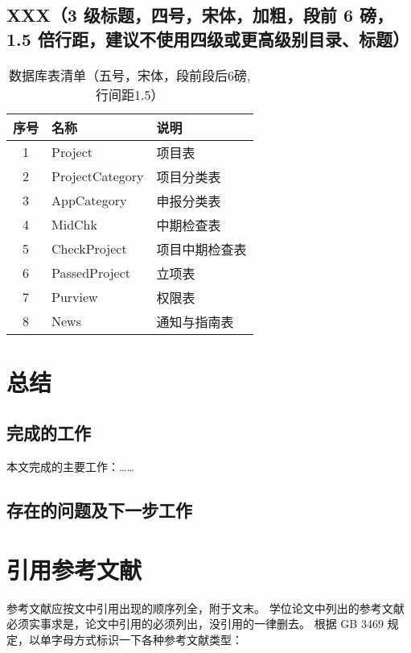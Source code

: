\documentclass[12pt]{zjutbook}
\begin{document}
\section{XXX（3 级标题，四号，宋体，加粗，段前 6 磅，1.5 倍行距，建议不使用四级或更高级别目录、标题）}
\begin{table}
  \centering
  \caption{数据库表清单（五号，宋体，段前段后6磅,行间距1.5）}
  \label{fig:list}
  \begin{tabular}{cll}
    \toprule  %
    \textbf{序号} & \textbf{名称}     & \textbf{说明} \\
    \midrule  %
    1           & Project         & 项目表         \\
    2           & ProjectCategory & 项目分类表       \\
    3           & AppCategory     & 申报分类表       \\
    4           & MidChk          & 中期检查表       \\
    5           & CheckProject    & 项目中期检查表     \\
    6           & PassedProject   & 立项表         \\
    7           & Purview         & 权限表         \\
    8           & News            & 通知与指南表      \\
    \bottomrule %
  \end{tabular}
\end{table}

\chapter{总结}
\section{完成的工作}
本文完成的主要工作：……

\section{存在的问题及下一步工作}
\chapter{引用参考文献}

参考文献应按文中引用出现的顺序列全，附于文末。
学位论文中列出的参考文献必须实事求是，论文中引用的必须列出，没引用的一律删去。
根据 GB 3469 规定，以单字母方式标识一下各种参考文献类型：
\end{document}
